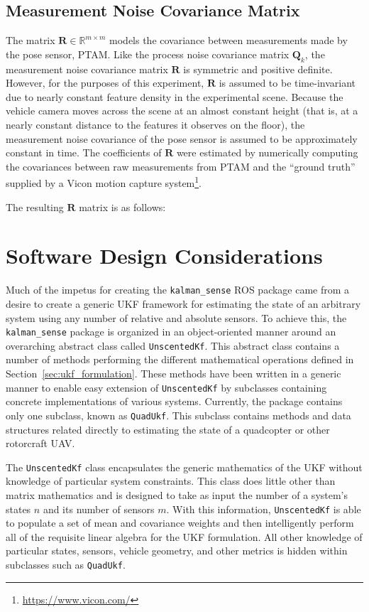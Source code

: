 \subsection{Measurement Noise Covariance Matrix} \label{sec:R_Matrix}
The matrix $\mathbf{R} \in \mathbb{R}^{m \times m}$ models the covariance between measurements made by the pose sensor, PTAM. Like the process noise covariance matrix $\mathbf{Q}_{k}$, the measurement noise covariance matrix $\mathbf{R}$ is symmetric and positive definite. However, for the purposes of this experiment, $\mathbf{R}$ is assumed to be time-invariant due to nearly constant feature density in the experimental scene. Because the vehicle camera moves across the scene at an almost constant height (that is, at a nearly constant distance to the features it observes on the floor), the measurement noise covariance of the pose sensor is assumed to be approximately constant in time. The coefficients of $\mathbf{R}$ were estimated by numerically computing the covariances between raw measurements from PTAM and the ``ground truth'' supplied by a Vicon motion capture system\footnote{\url{https://www.vicon.com/}}.

The resulting $\mathbf{R}$ matrix is as follows:
%

\section{Software Design Considerations}

Much of the impetus for creating the \texttt{kalman\_sense} ROS package came from a desire to create a generic UKF framework for estimating the state of an arbitrary system using any number of relative and absolute sensors. To achieve this, the \texttt{kalman\_sense} package is organized in an object-oriented manner around an overarching abstract class called \texttt{UnscentedKf}. This abstract class contains a number of methods performing the different mathematical operations defined in Section~\ref{sec:ukf_formulation}. These methods have been written in a generic manner to enable easy extension of \texttt{UnscentedKf} by subclasses containing concrete implementations of various systems. Currently, the package contains only one subclass, known as \texttt{QuadUkf}. This subclass contains methods and data structures related directly to estimating the state of a quadcopter or other rotorcraft UAV.

The \texttt{UnscentedKf} class encapsulates the generic mathematics of the UKF without knowledge of particular system constraints. This class does little other than matrix mathematics and is designed to take as input the number of a system's states $n$ and its number of sensors $m$. With this information, \texttt{UnscentedKf} is able to populate a set of mean and covariance weights and then intelligently perform all of the requisite linear algebra for the UKF formulation. All other knowledge of particular states, sensors, vehicle geometry, and other metrics is hidden within subclasses such as \texttt{QuadUkf}.

